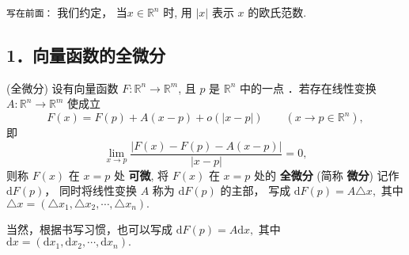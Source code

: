 
\verb|写在前面：| 我们约定， 当$x\in \mathbb{R}^n$ 时, 用 $|x|$ 表示 $x$ 的欧氏范数. 
\subsection{1．向量函数的全微分}
\begin{definition}{(全微分)}
设有向量函数 $F:\mathbb{R}^{n}\rightarrow\mathbb{R}^{m}$, 且 $p$ 是 $\mathbb{R}^n$ 中的一点 ．若存在线性变换 $A:\mathbb{R}^{n}\rightarrow\mathbb{R}^{m}$
使成立
\begin{equation}\label{vecdif_eq1}
F(x)=F(p)+A(x-p)+o(| x-p| )\quad\quad(x\rightarrow p\in\mathbb{R}^{n}),
\end{equation}
即
\[
{\displaystyle \lim_{x\rightarrow p}{\displaystyle \frac{|F(x)-F(p)-A(x-p)|}{| x-p| }=0,}}
\]
则称 $F(x)$ 在 $x=p$ 处 \textbf{可微}, 将 $F(x)$ 在 $x=p$ 处的 \textbf{全微分} (简称 \textbf{微分}) 记作  $\mathrm{d}F(p)$， 同时将线性变换 $A$ 称为 $\mathrm{d}F(p)$ 的主部， 写成  $\mathrm{d}F(p)=A \triangle x,$ 其中 $\triangle x=(\triangle x_1,\triangle x_2,\cdots,\triangle x_n).$ 

当然，根据书写习惯，也可以写成  $\mathrm{d}F(p)=A\mathrm{d}x,$ 其中 $\mathrm{d}x=(\mathrm{d}x_1,\mathrm{d}x_2,\cdots,\mathrm{d}x_n).$ 
\end{definition}

